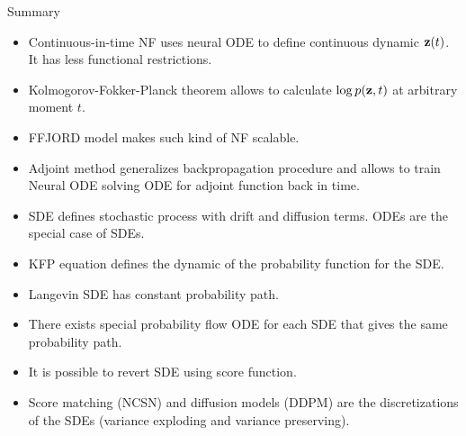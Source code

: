 \begin{frame}{Summary}
	\begin{itemize}
		\item Continuous-in-time NF uses neural ODE to define continuous dynamic $\mathbf{z}(t)$. It has less functional restrictions.
		\vfill 
		\item Kolmogorov-Fokker-Planck theorem allows to calculate $\log p(\mathbf{z}, t)$ at arbitrary moment $t$.
		\vfill
		\item FFJORD model makes such kind of NF scalable.
		\vfill
		\item Adjoint method generalizes backpropagation procedure and allows to train Neural ODE solving ODE for adjoint function back in time.
		\vfill
		\item SDE defines stochastic process with drift and diffusion terms. ODEs are the special case of SDEs.
		\vfill
		\item KFP equation defines the dynamic of the probability function for the SDE. 
		\vfill
		\item Langevin SDE has constant probability path.
		\vfill
		\item There exists special probability flow ODE for each SDE that gives the same probability path.
		\vfill
		\item It is possible to revert SDE using score function.
		\vfill
		\item Score matching (NCSN) and diffusion models (DDPM) are the discretizations of the SDEs (variance exploding and variance preserving).
	\end{itemize}
\end{frame}
 